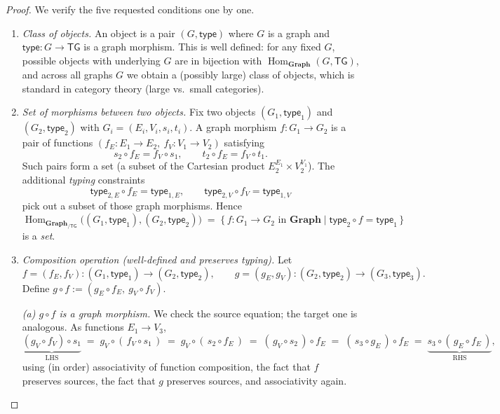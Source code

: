 \documentclass[11pt]{article}
\theoremstyle{definition}
\newcommand{\cat}[1]{\mathbf{#1}}
\newcommand{\Graph}{\cat{Graph}}
\newcommand{\Hom}{\operatorname{Hom}}
\begin{document}
\begin{proof}
We verify the five requested conditions one by one.

\begin{enumerate}[label=\textbf{(\arabic*)}, leftmargin=2.2em]

\item \emph{Class of objects.}
An object is a pair $(G,\mathsf{type})$ where $G$ is a graph and $\mathsf{type}:G\to\mathsf{TG}$ is a graph morphism.
This is well defined: for any fixed $G$, possible objects with underlying $G$ are in bijection with
$\Hom_{\Graph}(G,\mathsf{TG})$, and across all graphs $G$ we obtain a (possibly large) class of objects,
which is standard in category theory (large vs.\ small categories).

\item \emph{Set of morphisms between two objects.}
Fix two objects $(G_1,\mathsf{type}_1)$ and $(G_2,\mathsf{type}_2)$ with $G_i=(E_i,V_i,s_i,t_i)$.
A graph morphism $f:G_1\to G_2$ is a pair of functions $(f_E:E_1\to E_2,\ f_V:V_1\to V_2)$ satisfying
\[
  s_2\circ f_E = f_V\circ s_1,
  \qquad
  t_2\circ f_E = f_V\circ t_1.
\]
Such pairs form a set (a subset of the Cartesian product $E_2^{E_1}\times V_2^{V_1}$).
The additional \emph{typing} constraints
\[
  \mathsf{type}_{2,E}\circ f_E = \mathsf{type}_{1,E},
  \qquad
  \mathsf{type}_{2,V}\circ f_V = \mathsf{type}_{1,V}
\]
pick out a subset of those graph morphisms. Hence
\[
  \Hom_{\Graph_{/\mathsf{TG}}}\big((G_1,\mathsf{type}_1),(G_2,\mathsf{type}_2)\big)
  \;=\;
  \{\, f:G_1\to G_2 \text{ in }\Graph \mid \mathsf{type}_2\circ f=\mathsf{type}_1 \,\}
\]
is a \emph{set}.

\item \emph{Composition operation (well-defined and preserves typing).}
Let
\[
  f=(f_E,f_V):(G_1,\mathsf{type}_1)\to(G_2,\mathsf{type}_2),
  \qquad
  g=(g_E,g_V):(G_2,\mathsf{type}_2)\to(G_3,\mathsf{type}_3).
\]
Define $g\circ f:=(g_E\circ f_E,\ g_V\circ f_V)$.
\smallskip

\emph{(a) $g\circ f$ is a graph morphism.}
We check the source equation; the target one is analogous.
As functions $E_1\to V_3$,
\[
  \underbrace{(g_V\circ f_V)\circ s_1}_{\text{LHS}}
  \;=\;
  g_V\circ(\,f_V\circ s_1\,)
  \;=\;
  g_V\circ(\,s_2\circ f_E\,)
  \;=\;
  (\,g_V\circ s_2\,)\circ f_E
  \;=\;
  (\,s_3\circ g_E\,)\circ f_E
  \;=\;
  \underbrace{s_3\circ(\,g_E\circ f_E\,)}_{\text{RHS}},
\]
using (in order) associativity of function composition, the fact that $f$ preserves sources,
the fact that $g$ preserves sources, and associativity again.


\end{enumerate}
\end{proof}
\end{document}
